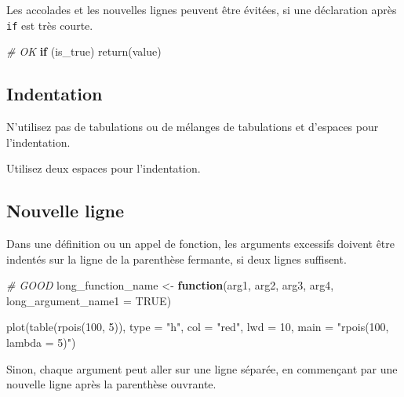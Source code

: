 \documentclass[
  french,
]{scrbook}
\newenvironment{Shaded}{\begin{snugshade}}{\end{snugshade}}
\newcommand{\AttributeTok}[1]{\textcolor[rgb]{0.77,0.63,0.00}{#1}}
\newcommand{\CommentTok}[1]{\textcolor[rgb]{0.56,0.35,0.01}{\textit{#1}}}
\newcommand{\ConstantTok}[1]{\textcolor[rgb]{0.00,0.00,0.00}{#1}}
\newcommand{\ControlFlowTok}[1]{\textcolor[rgb]{0.13,0.29,0.53}{\textbf{#1}}}
\newcommand{\DecValTok}[1]{\textcolor[rgb]{0.00,0.00,0.81}{#1}}
\newcommand{\FunctionTok}[1]{\textcolor[rgb]{0.00,0.00,0.00}{#1}}
\newcommand{\NormalTok}[1]{#1}
\newcommand{\OtherTok}[1]{\textcolor[rgb]{0.56,0.35,0.01}{#1}}
\newcommand{\StringTok}[1]{\textcolor[rgb]{0.31,0.60,0.02}{#1}}
\begin{document}
Les accolades et les nouvelles lignes peuvent être évitées, si une déclaration après \texttt{if} est très courte.

\begin{Shaded}
\begin{Highlighting}[]
\CommentTok{\# OK }
\ControlFlowTok{if}\NormalTok{ (is\_true) }\FunctionTok{return}\NormalTok{(value)}
\end{Highlighting}
\end{Shaded}

\hypertarget{indentation}{%
\subsection{Indentation}\label{indentation}}

N'utilisez pas de tabulations ou de mélanges de tabulations et d'espaces pour l'indentation.

Utilisez deux espaces pour l'indentation.

\hypertarget{nouvelle-ligne}{%
\subsection{Nouvelle ligne}\label{nouvelle-ligne}}

Dans une définition ou un appel de fonction, les arguments excessifs doivent être indentés sur la ligne de la parenthèse fermante, si deux lignes suffisent.

\begin{Shaded}
\begin{Highlighting}[]
\CommentTok{\# GOOD}
\NormalTok{long\_function\_name }\OtherTok{\textless{}{-}} \ControlFlowTok{function}\NormalTok{(arg1, arg2, arg3, arg4, }
                               \AttributeTok{long\_argument\_name1 =} \ConstantTok{TRUE}\NormalTok{)}
  
\FunctionTok{plot}\NormalTok{(}\FunctionTok{table}\NormalTok{(}\FunctionTok{rpois}\NormalTok{(}\DecValTok{100}\NormalTok{, }\DecValTok{5}\NormalTok{)), }\AttributeTok{type =} \StringTok{"h"}\NormalTok{, }\AttributeTok{col =} \StringTok{"red"}\NormalTok{, }\AttributeTok{lwd =} \DecValTok{10}\NormalTok{, }
     \AttributeTok{main =} \StringTok{"rpois(100, lambda = 5)"}\NormalTok{)}
\end{Highlighting}
\end{Shaded}

Sinon, chaque argument peut aller sur une ligne séparée, en commençant par une nouvelle ligne après la parenthèse ouvrante.
\end{document}
